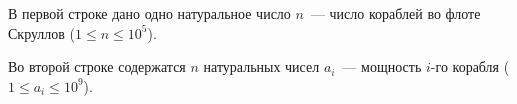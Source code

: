 В первой строке дано одно натуральное число $n$~--- число кораблей во флоте Скруллов ($1 \le n \le 10^5$).

Во второй строке содержатся $n$ натуральных чисел $a_i$~--- мощность $i$-го корабля ($1 \le a_i \le 10^9$).
